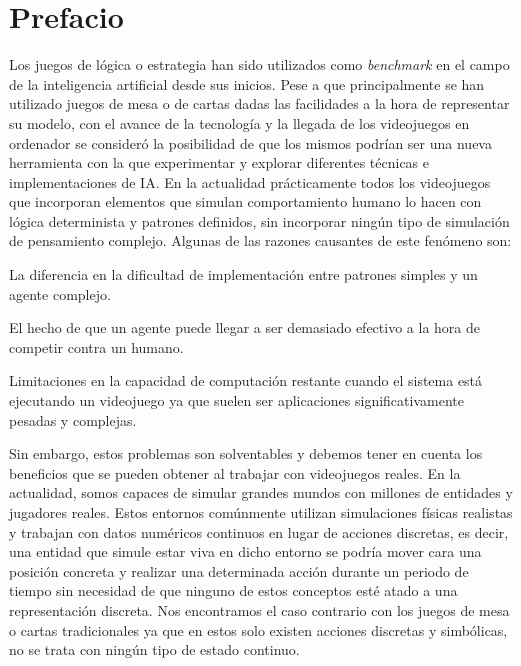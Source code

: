 \chapter{Prefacio}

Los juegos de lógica o estrategia han sido utilizados como {\it benchmark} en el campo de la inteligencia artificial desde sus inicios. Pese a que principalmente se han utilizado juegos de mesa o de cartas dadas las facilidades a la hora de representar su modelo, con el avance de la tecnología y la llegada de los videojuegos en ordenador se consideró la posibilidad de que los mismos podrían ser una nueva herramienta con la que experimentar y explorar diferentes técnicas e implementaciones de IA. En la actualidad prácticamente todos los videojuegos que incorporan elementos que simulan comportamiento humano lo hacen con lógica determinista y patrones definidos, sin incorporar ningún tipo de simulación de pensamiento complejo. Algunas de las razones causantes de este fenómeno son:

\begin{itemize}
{\item La diferencia en la dificultad de implementación entre patrones simples y un agente complejo.} 
{\item El hecho de que un agente puede llegar a ser demasiado efectivo a la hora de competir contra un humano.}
{\item Limitaciones en la capacidad de computación restante cuando el sistema está ejecutando un videojuego ya que suelen ser aplicaciones significativamente pesadas y complejas.}  
\end{itemize}


Sin embargo, estos problemas son solventables y debemos tener en cuenta los beneficios que se pueden obtener al trabajar con videojuegos reales. En la actualidad, somos capaces de simular grandes mundos con millones de entidades y jugadores reales. Estos entornos comúnmente utilizan simulaciones físicas realistas y trabajan con datos numéricos continuos en lugar de acciones discretas, es decir, una entidad que simule estar viva en dicho entorno se podría mover cara una posición concreta y realizar una determinada acción durante un periodo de tiempo sin necesidad de que ninguno de estos conceptos esté atado a una representación discreta. Nos encontramos el caso contrario con los juegos de mesa o cartas tradicionales ya que en estos solo existen acciones discretas y simbólicas, no se trata con ningún tipo de estado continuo.

